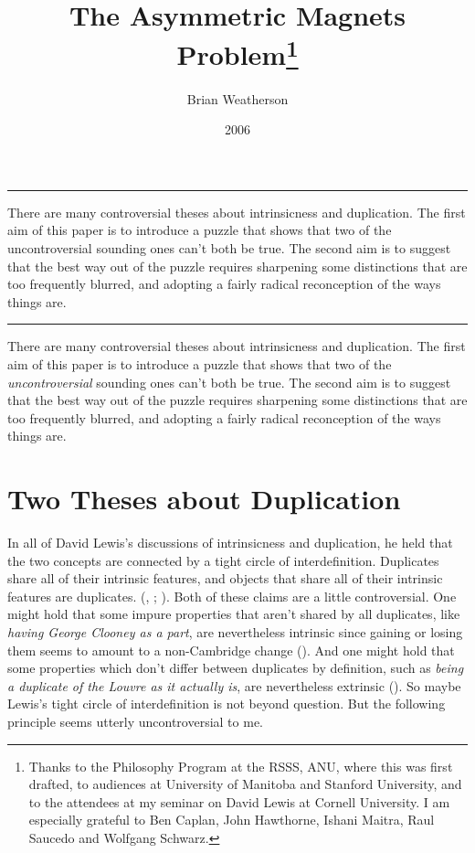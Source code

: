 \documentclass[
  10pt,
  letterpaper,
  DIV=11,
  numbers=noendperiod,
  twoside]{scrartcl}
\title{The Asymmetric Magnets Problem\thanks{Thanks to the Philosophy
Program at the RSSS, ANU, where this was first drafted, to audiences at
University of Manitoba and Stanford University, and to the attendees at
my seminar on David Lewis at Cornell University. I am especially
grateful to Ben Caplan, John Hawthorne, Ishani Maitra, Raul Saucedo and
Wolfgang Schwarz.}}
\author{Brian Weatherson}
\date{2006}
\renewenvironment{abstract}
 {\vspace{-1.25cm}
 \quotation\small\noindent\rule{\linewidth}{.5pt}\par\smallskip
 \noindent }
 {\par\noindent\rule{\linewidth}{.5pt}\endquotation}
\begin{document}
\maketitle
\begin{abstract}
There are many controversial theses about intrinsicness and duplication.
The first aim of this paper is to introduce a puzzle that shows that two
of the uncontroversial sounding ones can't both be true. The second aim
is to suggest that the best way out of the puzzle requires sharpening
some distinctions that are too frequently blurred, and adopting a fairly
radical reconception of the ways things are.
\end{abstract}

There are many controversial theses about intrinsicness and duplication.
The first aim of this paper is to introduce a puzzle that shows that two
of the \emph{uncontroversial} sounding ones can't both be true. The
second aim is to suggest that the best way out of the puzzle requires
sharpening some distinctions that are too frequently blurred, and
adopting a fairly radical reconception of the ways things are.

\section{Two Theses about
Duplication}\label{two-theses-about-duplication}

In all of David Lewis's discussions of intrinsicness and duplication, he
held that the two concepts are connected by a tight circle of
interdefinition. Duplicates share all of their intrinsic features, and
objects that share all of their intrinsic features are duplicates.
(,
;
). Both of these
claims are a little controversial. One might hold that some impure
properties that aren't shared by all duplicates, like \emph{having
George Clooney as a part}, are nevertheless intrinsic since gaining or
losing them seems to amount to a non-Cambridge change
(). And one might
hold that some properties which don't differ between duplicates by
definition, such as \emph{being a duplicate of the Louvre as it actually
is}, are nevertheless extrinsic (). So
maybe Lewis's tight circle of interdefinition is not beyond question.
But the following principle seems utterly uncontroversial to me.
\end{document}

